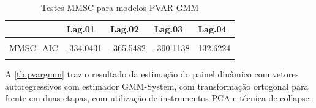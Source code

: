\documentclass[
  12pt,
  12pt,
  openright,
  oneside,
  a4paper,
  chapter=TITLE,
  section=TITLE,
  subsection=TITLE,
  subsubsection=TITLE,
  english,
  portugues,
  sumario=tradicional]{abntex2}
\begin{document}
\begin{table}[!hbtp]
\caption{Testes MMSC para modelos PVAR-GMM}
\vspace{-1mm}
\begingroup\fontsize{10}{12}\selectfont

\begin{tabu} to 
\toprule
  & Lag.01 & Lag.02 & Lag.03 & Lag.04\\
\midrule
{} &  &  &  & \\
MMSC\_AIC & -334.0431 & -365.5482 & -390.1138 & 132.6224\\
 &  &  &  & \\
\bottomrule
\end{tabu}
\endgroup{}
\vspace{1mm}
\label{tb:mmsc}
\vspace{-2mm}
\end{table}

A \autoref{tb:pvargmm} traz o resultado da estimação do painel dinâmico com vetores autoregressivos com estimador GMM-System, com transformação ortogonal para frente em duas etapas, com utilização de instrumentos PCA e técnica de collapse.

\vspace{20pt}
\vspace{-1mm}
\end{document}
